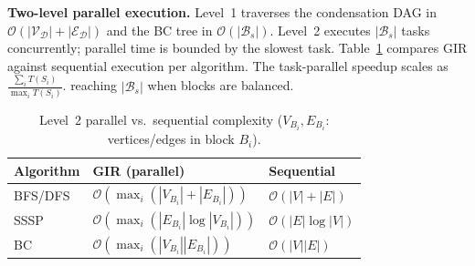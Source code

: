 \textbf{Two-level parallel execution.}
Level~1 traverses the condensation DAG in $\mathcal{O}(|\mathcal{V}_{\mathcal{D}}| + |\mathcal{E}_{\mathcal{D}}|)$
and the BC tree in $\mathcal{O}(|\mathcal{B}_s|)$.
Level~2 executes $|\mathcal{B}_s|$ tasks concurrently; parallel time is bounded by the slowest task.
Table~\ref{tab:complexity_parallel} compares GIR against sequential execution per algorithm.
The task-parallel speedup scales as 
$\frac{\sum_i T(S_i)}{\max_i T(S_i)}$.
reaching $|\mathcal{B}_s|$ when blocks are balanced.

\begin{table}[t]
\centering
\small
\setlength{\tabcolsep}{4pt}
\renewcommand{\arraystretch}{1.1}
\caption{Level~2 parallel vs.\ sequential complexity ($V_{B_i}, E_{B_i}$: vertices/edges in block $B_i$).}
\label{tab:complexity_parallel}
\begin{tabular}{l l l}
\toprule
\textbf{Algorithm} & \textbf{GIR (parallel)} & \textbf{Sequential} \\
\midrule
BFS/DFS & $\mathcal{O}\!\left(\max_i(|V_{B_i}|+|E_{B_i}|)\right)$
        & $\mathcal{O}(|V|+|E|)$ \\
SSSP    & $\mathcal{O}\!\left(\max_i(|E_{B_i}|\log|V_{B_i}|)\right)$
        & $\mathcal{O}(|E|\log|V|)$ \\
BC      & $\mathcal{O}\!\left(\max_i(|V_{B_i}||E_{B_i}|)\right)$
        & $\mathcal{O}(|V||E|)$ \\
\bottomrule
\end{tabular}
\end{table}
